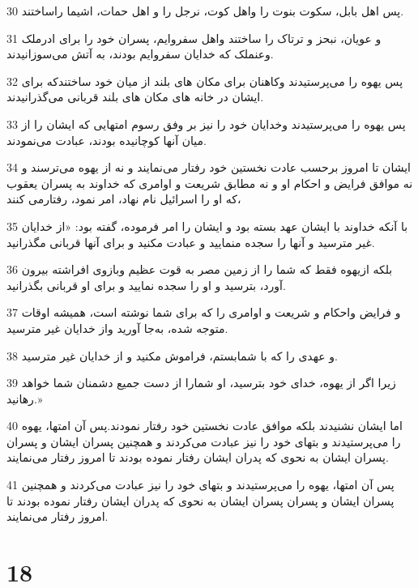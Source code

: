 \par 30 پس اهل بابل، سکوت بنوت را واهل کوت، نرجل را و اهل حمات، اشیما راساختند.
\par 31 و عویان، نبحز و ترتاک را ساختند واهل سفروایم، پسران خود را برای ادرملک وعنملک که خدایان سفروایم بودند، به آتش می‌سوزانیدند.
\par 32 پس یهوه را می‌پرستیدند وکاهنان برای مکان های بلند از میان خود ساختندکه برای ایشان در خانه های مکان های بلند قربانی می‌گذرانیدند.
\par 33 پس یهوه را می‌پرستیدند وخدایان خود را نیز بر وفق رسوم امتهایی که ایشان را از میان آنها کوچانیده بودند، عبادت می‌نمودند.
\par 34 ایشان تا امروز بر‌حسب عادت نخستین خود رفتار می‌نمایند و نه از یهوه می‌ترسند و نه موافق فرایض و احکام او و نه مطابق شریعت و اوامری که خداوند به پسران یعقوب که او را اسرائیل نام نهاد، امر نمود، رفتارمی کنند،
\par 35 با آنکه خداوند با ایشان عهد بسته بود و ایشان را امر فرموده، گفته بود: «از خدایان غیر مترسید و آنها را سجده منمایید و عبادت مکنید و برای آنها قربانی مگذرانید.
\par 36 بلکه ازیهوه فقط که شما را از زمین مصر به قوت عظیم وبازوی افراشته بیرون آورد، بترسید و او را سجده نمایید و برای او قربانی بگذرانید.
\par 37 و فرایض واحکام و شریعت و اوامری را که برای شما نوشته است، همیشه اوقات متوجه شده، به‌جا آورید واز خدایان غیر مترسید.
\par 38 و عهدی را که با شمابستم، فراموش مکنید و از خدایان غیر مترسید.
\par 39 زیرا اگر از یهوه، خدای خود بترسید، او شمارا از دست جمیع دشمنان شما خواهد رهانید.»
\par 40 اما ایشان نشنیدند بلکه موافق عادت نخستین خود رفتار نمودند.پس آن امتها، یهوه را می‌پرستیدند و بتهای خود را نیز عبادت می‌کردند و همچنین پسران ایشان و پسران پسران ایشان به نحوی که پدران ایشان رفتار نموده بودند تا امروز رفتار می‌نمایند.
\par 41 پس آن امتها، یهوه را می‌پرستیدند و بتهای خود را نیز عبادت می‌کردند و همچنین پسران ایشان و پسران پسران ایشان به نحوی که پدران ایشان رفتار نموده بودند تا امروز رفتار می‌نمایند.
 
\chapter{18}


